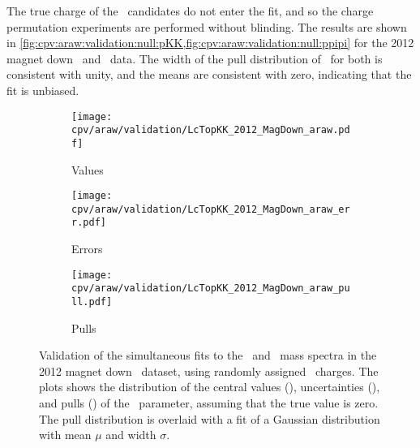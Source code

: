 
The true charge of the \PLambdac\ candidates do not enter the fit, and so the
charge permutation experiments are performed without blinding.
The results are shown in
\cref{fig:cpv:araw:validation:null:pKK,fig:cpv:araw:validation:null:ppipi} for
the 2012 magnet down \pKK\ and \ppipi\ data.
The width of the pull distribution of \ARaw\ for both is consistent with unity,
and the means are consistent with zero, indicating that the fit is unbiased.

\begin{figure}
  \begin{subfigure}[t]{0.32\textwidth}
    \texttt{[image: cpv/araw/validation/LcTopKK\_2012\_MagDown\_araw.pdf]}
    \caption{Values}
    \label{fig:cpv:araw:validation:null:pKK:values}
  \end{subfigure}
  \begin{subfigure}[t]{0.32\textwidth}
    \texttt{[image: cpv/araw/validation/LcTopKK\_2012\_MagDown\_araw\_err.pdf]}
    \caption{Errors}
    \label{fig:cpv:araw:validation:null:pKK:errors}
  \end{subfigure}
  \begin{subfigure}[t]{0.32\textwidth}
    \texttt{[image: cpv/araw/validation/LcTopKK\_2012\_MagDown\_araw\_pull.pdf]}
    \caption{Pulls}
    \label{fig:cpv:araw:validation:null:pKK:pulls}
  \end{subfigure}
  \caption{%
    Validation of the simultaneous fits to the \PLambdac\ and \APLambdac\ mass
    spectra in the 2012 magnet down \pKK\ dataset, using randomly assigned
    \PLambdac\ charges.
    The plots shows the distribution of the central values
    (), uncertainties
    (), and pulls
    () of the \ARaw\ parameter,
    assuming that the true value is zero.
    The pull distribution is overlaid with a fit of a Gaussian distribution
    with mean $\mu$ and width $\sigma$.
  }
  \label{fig:cpv:araw:validation:null:pKK}
\end{figure}

